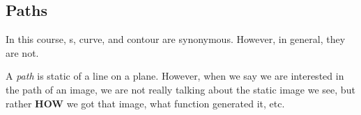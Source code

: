 \subsection{Paths}\label{subsec:Paths}
In this course, s, curve, and contour are synonymous.
However, in general, they are not.

\begin{definition}[Path]\label{def:Path}
  A \emph{path} is static  of a line on a plane.
  However, when we say we are interested in the path of an image, we are not really talking about the static image we see, but rather \textbf{HOW} we got that image, what function generated it, etc.
\end{definition}


